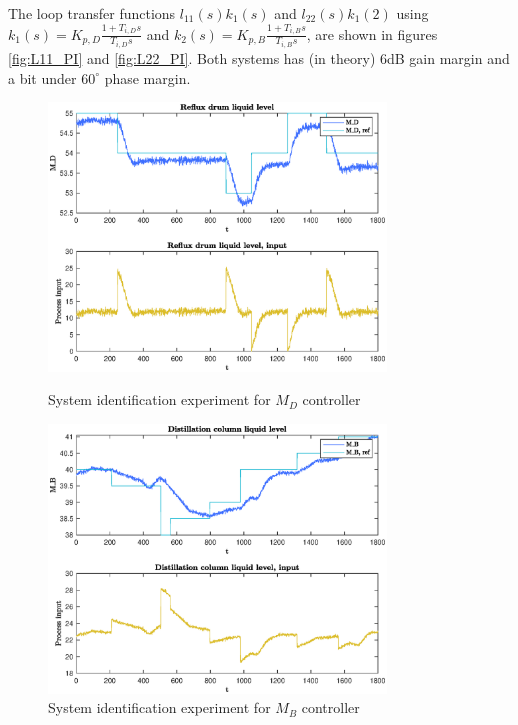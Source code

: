 \documentclass[12pt]{article}
\begin{document}
The loop transfer functions $l_{11}(s) k_1(s)$ and $l_{22}(s) k_1(2)$ using $k_1(s) = K_{p, D}\frac{1 + T_{i, D} s}{T_{i, D} s}$ and $k_2(s) = K_{p, B}\frac{1 + T_{i, B} s}{T_{i, B} s}$, are shown in figures \ref{fig:L11_PI} and \ref{fig:L22_PI}. Both systems has (in theory) 6dB gain margin and a bit under $60^\circ$ phase margin.

\begin{figure}
\centering
\includegraphics[width=0.8\textwidth]{../Systemanalyse/Log_Data_to_Matlab/Figurer/Identifisering/MD_eksperiment.eps}
\caption{System identification experiment for $M_D$ controller}
\label{fig:MD_experiment}

\includegraphics[width=0.8\textwidth]{../Systemanalyse/Log_Data_to_Matlab/Figurer/Identifisering/MB_eksperiment.eps}
\caption{System identification experiment for $M_B$ controller}
\label{fig:MD_experiment}
\end{figure}
\end{document}
